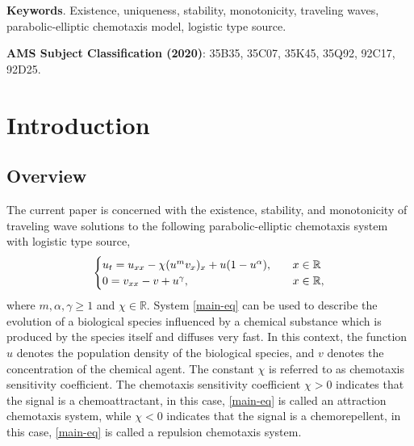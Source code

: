 \documentclass[11pt]{article} %
\theoremstyle{remark}
\theoremstyle{remark}
\numberwithin{equation}{section}
\numberwithin{figure}{section}
\numberwithin{table}{section}
\newcommand\RR{\ensuremath{\mathbb{R}}}
\begin{document}
\begin{abstract}
Note that when $m=\gamma=\alpha=1$, it is proved in \cite{GrHeTu2023} that negative chemotaxis  speeds up 
front propagation and when $\chi\ll -1$, the speed $c\ge O(\sqrt{|\chi|})$.
The lower bound $c^*_{\chi,m,\gamma}$ for wave speeds of traveling wave solutions of (CM) with $\chi\le 0$ is not expected to be optimal, but it is close to optimal when $|\chi|$ is small and large in the sense that
when $\chi=0$ and $\gamma=1$, $c^*_{\chi,m,\gamma}=2$,
which is the optimal lower bound for the wave speeds of (CM) with $\chi=0$, and when $\chi\to -\infty$, 
$c^*_{\chi,m,\gamma}=O(\sqrt{|\chi|})$. 
Also,  $c^{**}_{\chi,m, \alpha,\gamma}$ is not expected to be optimal,   but $c^{**}_{\chi,m,\alpha,\gamma}$ is close to optimal when $|\chi|$ is small  and $\gamma=1$ in the sense
that $c^{**}_{\chi,m,\alpha,\gamma}=2+O(|\chi|^{1/6})$ when $|\chi|\to 0$.
\end{abstract}


\noindent \textbf{Keywords}.  Existence, uniqueness,  stability,  monotonicity, traveling waves, parabolic-elliptic chemotaxis model,  logistic type  source.

\medskip

\noindent \textbf{AMS Subject Classification (2020)}: 35B35, 35C07, 35K45, 35Q92, 92C17, 92D25.

\newpage

\tableofcontents


\newpage

\section{Introduction}


\subsection{Overview} 

The  current paper is concerned with the existence,  stability, and monotonicity of  traveling wave solutions 
to the following parabolic-elliptic chemotaxis system with logistic type source,
\begin{equation}
\label{main-eq}
\begin{cases}
u_t=u_{xx}-\chi(u^m v_x)_x +u(1-u^\alpha),\quad &x\in\RR\cr
0=v_{xx}-v+u^\gamma,\quad&x\in\RR,
\end{cases}
\end{equation}
where $m,\alpha,\gamma\ge 1$ and $\chi\in\RR$. System \eqref{main-eq} can be used to describe   the evolution of a biological species influenced by a chemical substance which is  produced by the species itself
and diffuses very fast. 
In this context,
 the function $u$ denotes the population density of
the biological species, and $v$ denotes the concentration of the chemical agent. The constant $\chi$ 
is referred to as chemotaxis sensitivity coefficient.  
The chemotaxis sensitivity coefficient $\chi >0$ indicates that the signal is a chemoattractant,  in this case, \eqref{main-eq} is called an attraction chemotaxis system,
while $\chi<0$ indicates that the signal is  a chemorepellent, in this case, \eqref{main-eq} is called a repulsion chemotaxis system.
\end{document}
